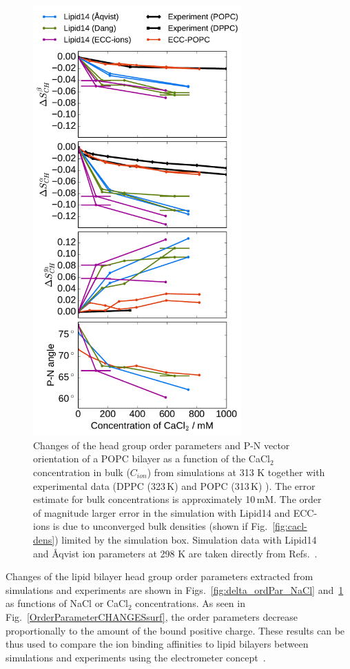 \begin{figure}[htb!] 
  \centering 
  \includegraphics[width=8.0cm]{../img/ecc_popc/PN_angle_OrdPars-A-B-g3_L14-ECCL17_q80_sig89_CaCl.pdf} 
  \caption{\label{fig:delta_ordPar_CaCl} 
    Changes of the head group order parameters and P-N vector orientation of a POPC bilayer  
    as a function of the CaCl$_2$ concentration in bulk ($C_{ion}$) 
    from simulations at 313 K together with experimental data  
    (DPPC (323\,K) \citep{akutsu81} and POPC (313\,K) \citep{altenbach84}).  
    The error estimate for bulk concentrations is approximately 10\,mM. 
    The order of magnitude larger error in the
    simulation with Lipid14 and ECC-ions is due to unconverged bulk densities  (shown if Fig.~\ref{fig:cacl-dens}) limited by
    the simulation box.  
    Simulation data with Lipid14 and Åqvist ion parameters at 298 K are taken directly from 
    Refs.~\citep{lipid14POPC0mMNaClfiles,lipid14POPC350mMCaClfiles,lipid14POPC350mMCaClfilesNC}. 
  } 
\end{figure} 
 
Changes of the lipid bilayer head group order parameters extracted from simulations and 
experiments \citep{akutsu81, altenbach84} are shown in Figs.~\ref{fig:delta_ordPar_NaCl} 
and~\ref{fig:delta_ordPar_CaCl} as functions of NaCl or CaCl$_2$ concentrations. 
As seen in Fig.~\ref{OrderParameterCHANGESsurf}, the order parameters decrease 
proportionally to the amount of the bound positive charge. 
These results can be thus used to compare the ion binding affinities to lipid bilayers between 
simulations and experiments using the electrometer concept~\citep{seelig87, catte16}. 
 
